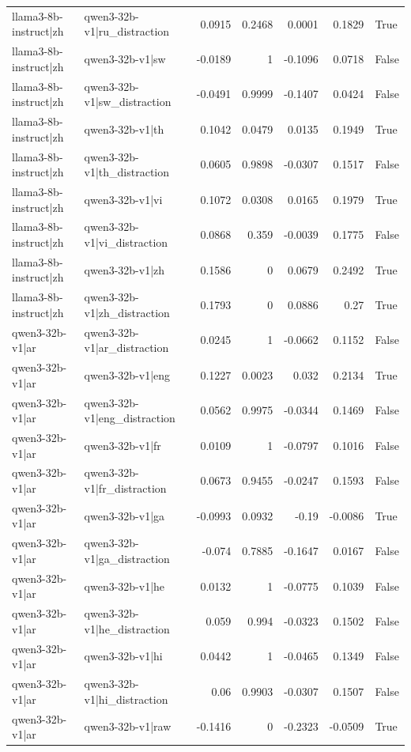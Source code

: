 \begin{table}
\begin{tabular}{l l r r r r l}
llama3-8b-instruct|zh & qwen3-32b-v1|ru_distraction & 0.0915 & 0.2468 & 0.0001 & 0.1829 & True \\
llama3-8b-instruct|zh & qwen3-32b-v1|sw & -0.0189 & 1 & -0.1096 & 0.0718 & False \\
llama3-8b-instruct|zh & qwen3-32b-v1|sw_distraction & -0.0491 & 0.9999 & -0.1407 & 0.0424 & False \\
llama3-8b-instruct|zh & qwen3-32b-v1|th & 0.1042 & 0.0479 & 0.0135 & 0.1949 & True \\
llama3-8b-instruct|zh & qwen3-32b-v1|th_distraction & 0.0605 & 0.9898 & -0.0307 & 0.1517 & False \\
llama3-8b-instruct|zh & qwen3-32b-v1|vi & 0.1072 & 0.0308 & 0.0165 & 0.1979 & True \\
llama3-8b-instruct|zh & qwen3-32b-v1|vi_distraction & 0.0868 & 0.359 & -0.0039 & 0.1775 & False \\
llama3-8b-instruct|zh & qwen3-32b-v1|zh & 0.1586 & 0 & 0.0679 & 0.2492 & True \\
llama3-8b-instruct|zh & qwen3-32b-v1|zh_distraction & 0.1793 & 0 & 0.0886 & 0.27 & True \\
qwen3-32b-v1|ar & qwen3-32b-v1|ar_distraction & 0.0245 & 1 & -0.0662 & 0.1152 & False \\
qwen3-32b-v1|ar & qwen3-32b-v1|eng & 0.1227 & 0.0023 & 0.032 & 0.2134 & True \\
qwen3-32b-v1|ar & qwen3-32b-v1|eng_distraction & 0.0562 & 0.9975 & -0.0344 & 0.1469 & False \\
qwen3-32b-v1|ar & qwen3-32b-v1|fr & 0.0109 & 1 & -0.0797 & 0.1016 & False \\
qwen3-32b-v1|ar & qwen3-32b-v1|fr_distraction & 0.0673 & 0.9455 & -0.0247 & 0.1593 & False \\
qwen3-32b-v1|ar & qwen3-32b-v1|ga & -0.0993 & 0.0932 & -0.19 & -0.0086 & True \\
qwen3-32b-v1|ar & qwen3-32b-v1|ga_distraction & -0.074 & 0.7885 & -0.1647 & 0.0167 & False \\
qwen3-32b-v1|ar & qwen3-32b-v1|he & 0.0132 & 1 & -0.0775 & 0.1039 & False \\
qwen3-32b-v1|ar & qwen3-32b-v1|he_distraction & 0.059 & 0.994 & -0.0323 & 0.1502 & False \\
qwen3-32b-v1|ar & qwen3-32b-v1|hi & 0.0442 & 1 & -0.0465 & 0.1349 & False \\
qwen3-32b-v1|ar & qwen3-32b-v1|hi_distraction & 0.06 & 0.9903 & -0.0307 & 0.1507 & False \\
qwen3-32b-v1|ar & qwen3-32b-v1|raw & -0.1416 & 0 & -0.2323 & -0.0509 & True \\

\end{tabular}
\end{table}
